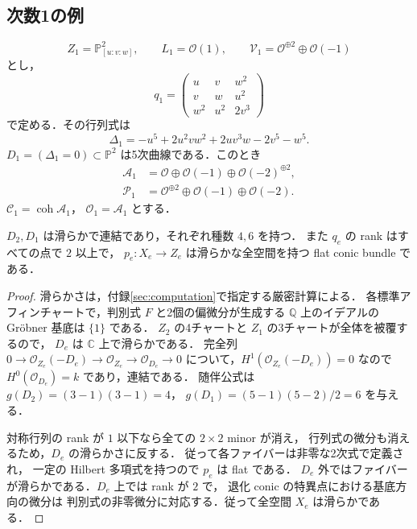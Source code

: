 \subsection{次数1の例}
\label{subsec:example1}

\[
 Z_1=\mathbb P^2_{[u:v:w]},\qquad
 L_1=\mathcal O(1),\qquad
 \mathcal V_1=\mathcal O^{\oplus2}\oplus\mathcal O(-1)
\]
とし，
\begin{equation}
 q_1=
 \begin{pmatrix}
 u&v&w^2\\
 v&w&u^2\\
 w^2&u^2&2v^3
 \end{pmatrix}
 \label{eq:q1}
\end{equation}
で定める．その行列式は
\begin{equation}
 \Delta_1=-u^5+2u^2vw^2+2uv^3w-2v^5-w^5.
 \label{eq:discriminant1}
\end{equation}
$D_1=(\Delta_1=0)\subset\mathbb P^2$ は5次曲線である．このとき
\begin{equation}
 \begin{split}
 \mathcal A_1&=\mathcal O\oplus\mathcal O(-1)\oplus\mathcal O(-2)^{\oplus2},\\
 \mathcal P_1&=\mathcal O^{\oplus2}\oplus\mathcal O(-1)\oplus\mathcal O(-2).
 \end{split}
 \label{eq:bundles1}
\end{equation}
$\mathcal C_1=\operatorname{coh}\mathcal A_1$，
$\mathcal O_1=\mathcal A_1$ とする．

\begin{lemma}
\label{lem:smooth}
$D_2,D_1$ は滑らかで連結であり，それぞれ種数 $4,6$ を持つ．
また $q_e$ の rank はすべての点で $2$ 以上で，
$p_e:X_e\to Z_e$ は滑らかな全空間を持つ flat conic bundle である．
\end{lemma}
\begin{proof}
滑らかさは，付録\ref{sec:computation}で指定する厳密計算による．
各標準アフィンチャートで，判別式 $F$ と2個の偏微分が生成する
$\mathbb Q$ 上のイデアルの Gröbner 基底は $\{1\}$ である．
$Z_2$ の4チャートと $Z_1$ の3チャートが全体を被覆するので，
$D_e$ は $\mathbb C$ 上で滑らかである．
完全列 $0\to\mathcal O_{Z_e}(-D_e)\to\mathcal O_{Z_e}\to
\mathcal O_{D_e}\to0$ について，$H^1(\mathcal O_{Z_e}(-D_e))=0$ なので
$H^0(\mathcal O_{D_e})=k$ であり，連結である．
随伴公式は $g(D_2)=(3-1)(3-1)=4$，
$g(D_1)=(5-1)(5-2)/2=6$ を与える．

対称行列の rank が $1$ 以下なら全ての $2\times2$ minor が消え，
行列式の微分も消えるため，$D_e$ の滑らかさに反する．
従って各ファイバーは非零な2次式で定義され，
一定の Hilbert 多項式を持つので $p_e$ は flat である．
$D_e$ 外ではファイバーが滑らかである．$D_e$ 上では rank が $2$ で，
退化 conic の特異点における基底方向の微分は
判別式の非零微分に対応する．従って全空間 $X_e$ は滑らかである．
\end{proof}

